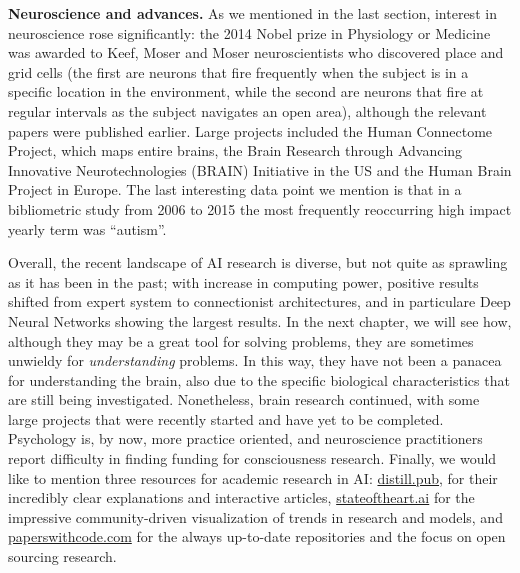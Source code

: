 \documentclass[../main.tex]{subfiles}
\begin{document}
\vspace{4pt}
\textbf{Neuroscience and advances.} As we mentioned in the last section, interest in neuroscience rose significantly: the 2014 Nobel prize in Physiology or Medicine was awarded to Keef, Moser and Moser neuroscientists who discovered place and grid cells (the first are neurons that fire frequently when the subject is in a specific location in the environment, while the second are neurons that fire at regular intervals as the subject navigates an open area), although the relevant papers were published earlier\cite{okeefeDualPhaseRate2005}\cite{moserPlaceCellsGrid2008}. Large projects included the Human Connectome Project\cite{ltdNews2010}, which maps entire brains, the Brain Research through Advancing Innovative Neurotechnologies (BRAIN) Initiative\cite{NIHBRAINInitiative2013} in the US and the Human Brain Project\cite{CountdownDigitalSimulation2012} in Europe. The last interesting data point we mention is that in a bibliometric study from 2006 to 2015\cite{yeungChangingLandscapeNeuroscience2017} the most frequently reoccurring high impact yearly term was ``autism''.


\vspace{5pt}
Overall, the recent landscape of AI research is diverse, but not quite as sprawling as it has been in the past; with increase in computing power, positive results shifted from expert system to connectionist architectures, and in particulare Deep Neural Networks showing the largest results. In the next chapter, we will see how, although they may be a great tool for solving problems, they are sometimes unwieldy for \textit{understanding} problems. In this way, they have not been a panacea for understanding the brain, also due to the specific biological characteristics that are still being investigated. Nonetheless, brain research continued, with some large projects that were recently started and have yet to be completed. Psychology is, by now, more practice oriented, and neuroscience practitioners report difficulty in finding funding for consciousness research. Finally, we would like to mention three resources for academic research in AI: \href{https://distill.pub}{distill.pub}, for their incredibly clear explanations and interactive articles, \href{https://www.stateoftheart.ai}{stateoftheart.ai} for the impressive community-driven visualization of trends in research and models, and \href{https://paperswithcode.com/}{paperswithcode.com} for the always up-to-date repositories and the focus on open sourcing research.
\end{document}

